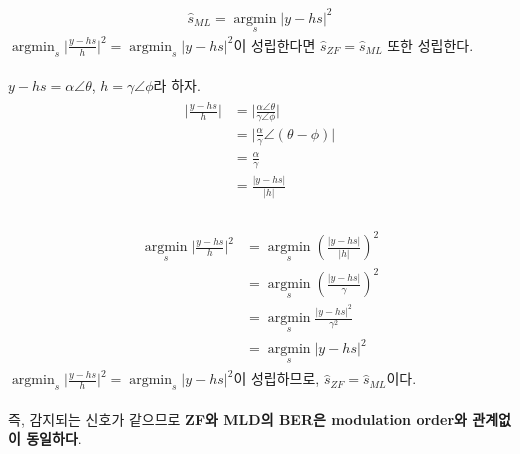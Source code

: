 \documentclass{article}
\newcommand{\bd}{\textbf} %
\providecommand{\abs}[1]{\lvert#1\rvert}
\begin{document}
\begin{gather}
\hat{s}_{ML}=\operatorname*{argmin}_s \abs{y-hs}^2
\end{gather}
$\operatorname*{argmin}_s \abs{\frac{y-hs}{h}}^2 = \operatorname*{argmin}_s \abs{y-hs}^2$이 성립한다면 $\hat{s}_{ZF}=\hat{s}_{ML}$ 또한 성립한다.\\
\\
$y-hs=\alpha\angle\theta$, $h=\gamma\angle\phi$라 하자.
\begin{gather}
\begin{split}
\abs{\frac{y-hs}{h}}&=\abs{\frac{\alpha\angle\theta}{\gamma\angle\phi}}\\
&=\abs{\frac{\alpha}{\gamma}\angle(\theta-\phi)}\\
&=\frac{\alpha}{\gamma}\\
&=\frac{\abs{y-hs}}{\abs{h}}\\
\end{split}
\end{gather}

\begin{gather}
\begin{split}
\operatorname*{argmin}_s \abs{\frac{y-hs}{h}}^2&=\operatorname*{argmin}_s (\frac{\abs{y-hs}}{\abs{h}})^2\\
&=\operatorname*{argmin}_s (\frac{\abs{y-hs}}{\gamma})^2\\
&=\operatorname*{argmin}_s \frac{\abs{y-hs}^2}{\gamma^2}\\
&=\operatorname*{argmin}_s\abs{y-hs}^2
\end{split}
\end{gather}
$\operatorname*{argmin}_s \abs{\frac{y-hs}{h}}^2 = \operatorname*{argmin}_s \abs{y-hs}^2$이 성립하므로, $\hat{s}_{ZF}=\hat{s}_{ML}$이다.\\
\\
즉, 감지되는 신호가 같으므로 \bd{ZF와 MLD의 BER은 modulation order와 관계없이 동일하다}.
\end{document}
